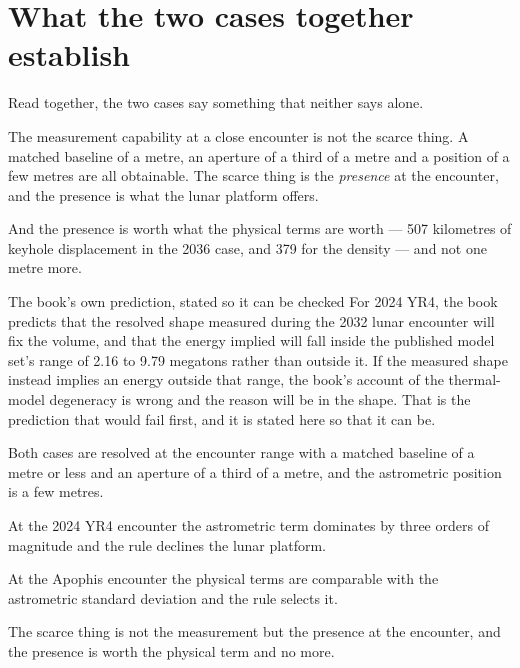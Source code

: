 \section{What the two cases together establish}


Read together, the two cases say something that neither says alone.

The measurement capability at a close encounter is not the scarce thing. A
matched baseline of a metre, an aperture of a third of a metre and a
position of a few metres are all obtainable. The scarce thing is the
\emph{presence} at the encounter, and the presence is what the lunar
platform offers.

And the presence is worth what the physical terms are worth --- 507
kilometres of keyhole displacement in the 2036 case, and 379 for the
density --- and not one metre more.

\begin{seamnote}{The book's own prediction, stated so it can be checked}
For 2024 YR4, the book predicts that the resolved shape measured during the
2032 lunar encounter will fix the volume, and that the energy implied will
fall inside the published model set's range of 2.16 to 9.79 megatons rather
than outside it. If the measured shape instead implies an energy outside
that range, the book's account of the thermal-model degeneracy is wrong and
the reason will be in the shape. That is the prediction that would fail
first, and it is stated here so that it can be.
\end{seamnote}

\begin{keytakeaways}
\item Both cases are resolved at the encounter range with a matched baseline
of a metre or less and an aperture of a third of a metre, and the astrometric
position is a few metres.
\item At the 2024 YR4 encounter the astrometric term dominates by three
orders of magnitude and the rule declines the lunar platform.
\item At the Apophis encounter the physical terms are comparable with the
astrometric standard deviation and the rule selects it.
\item The scarce thing is not the measurement but the presence at the
encounter, and the presence is worth the physical term and no more.
\end{keytakeaways}
